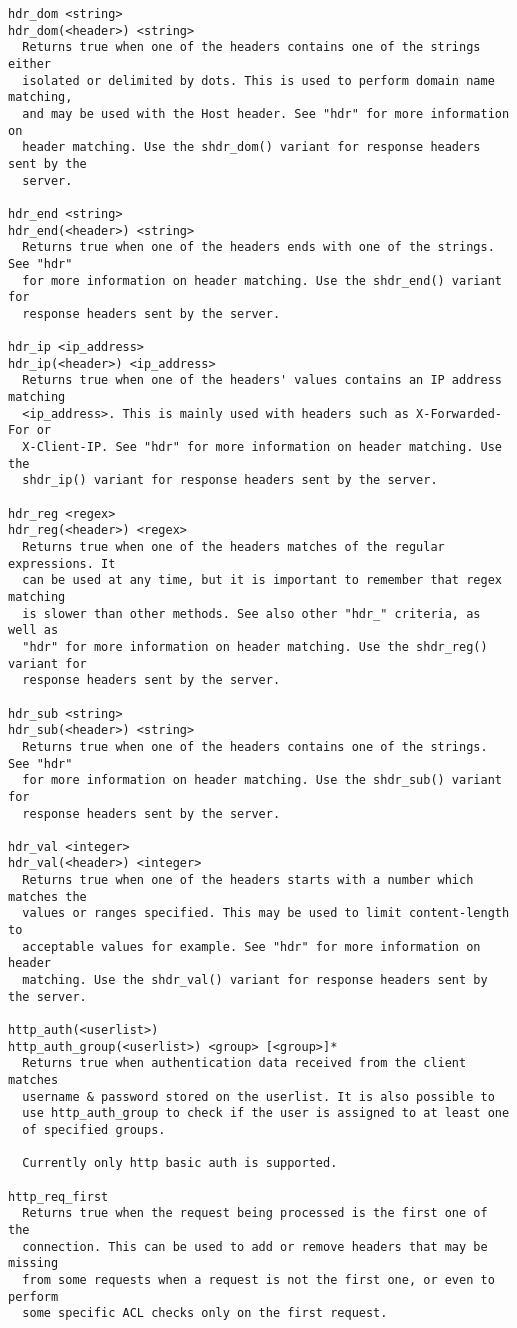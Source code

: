 \begin{verbatim}
hdr_dom <string>
hdr_dom(<header>) <string>
  Returns true when one of the headers contains one of the strings either
  isolated or delimited by dots. This is used to perform domain name matching,
  and may be used with the Host header. See "hdr" for more information on
  header matching. Use the shdr_dom() variant for response headers sent by the
  server.

hdr_end <string>
hdr_end(<header>) <string>
  Returns true when one of the headers ends with one of the strings. See "hdr"
  for more information on header matching. Use the shdr_end() variant for
  response headers sent by the server.

hdr_ip <ip_address>
hdr_ip(<header>) <ip_address>
  Returns true when one of the headers' values contains an IP address matching
  <ip_address>. This is mainly used with headers such as X-Forwarded-For or
  X-Client-IP. See "hdr" for more information on header matching. Use the
  shdr_ip() variant for response headers sent by the server.

hdr_reg <regex>
hdr_reg(<header>) <regex>
  Returns true when one of the headers matches of the regular expressions. It
  can be used at any time, but it is important to remember that regex matching
  is slower than other methods. See also other "hdr_" criteria, as well as
  "hdr" for more information on header matching. Use the shdr_reg() variant for
  response headers sent by the server.

hdr_sub <string>
hdr_sub(<header>) <string>
  Returns true when one of the headers contains one of the strings. See "hdr"
  for more information on header matching. Use the shdr_sub() variant for
  response headers sent by the server.

hdr_val <integer>
hdr_val(<header>) <integer>
  Returns true when one of the headers starts with a number which matches the
  values or ranges specified. This may be used to limit content-length to
  acceptable values for example. See "hdr" for more information on header
  matching. Use the shdr_val() variant for response headers sent by the server.

http_auth(<userlist>)
http_auth_group(<userlist>) <group> [<group>]*
  Returns true when authentication data received from the client matches
  username & password stored on the userlist. It is also possible to
  use http_auth_group to check if the user is assigned to at least one
  of specified groups.

  Currently only http basic auth is supported.

http_req_first
  Returns true when the request being processed is the first one of the
  connection. This can be used to add or remove headers that may be missing
  from some requests when a request is not the first one, or even to perform
  some specific ACL checks only on the first request.


\end{verbatim}
